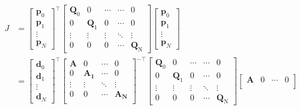 \documentclass[conference]{IEEEtran}
\begin{document}
    \begin{equation}
        \begin{aligned}
            J 
            &= 
            \begin{bmatrix}\boldsymbol p_0\\\boldsymbol p_1\\\vdots\\\boldsymbol p_ N\end{bmatrix}^\top
            \begin{bmatrix}\boldsymbol Q_0&0&\cdots&\cdots&0\\0&\boldsymbol Q_1&0&\cdots&0\\\vdots&\vdots&\vdots&\ddots&\vdots\\0&0&0&\cdots&\boldsymbol Q_\mathrm N\end{bmatrix}
            \begin{bmatrix}\boldsymbol p_0\\\boldsymbol p_1\\\vdots\\\boldsymbol p_ N\end{bmatrix}
            \\
            &= 
            \begin{bmatrix}
            \boldsymbol{d}_{0} \\
            \boldsymbol{d}_{1} \\
            \vdots  \\
            \boldsymbol{d}_{N} 
            \end{bmatrix}^{\top}
            \begin{bmatrix}
            \boldsymbol{A} & 0 &\cdots &0 \\
            0 & \boldsymbol{A_{1}}  &\cdots &0 \\ 
            \vdots &\vdots &\ddots &\vdots    \\
            0 & 0 &\cdots  &\boldsymbol{A_{N}} \\
            \end{bmatrix}^{-\top}
            \begin{bmatrix}\boldsymbol Q_0&0&\cdots&\cdots&0\\0&\boldsymbol Q_1&0&\cdots&0\\\vdots&\vdots&\vdots&\ddots&\vdots\\0&0&0&\cdots&\boldsymbol Q_\mathrm N\end{bmatrix}
            \begin{bmatrix}
            \boldsymbol{A} & 0 &\cdots &0 \\

\end{bmatrix}
\end{aligned}
\end{equation}
\end{document}
